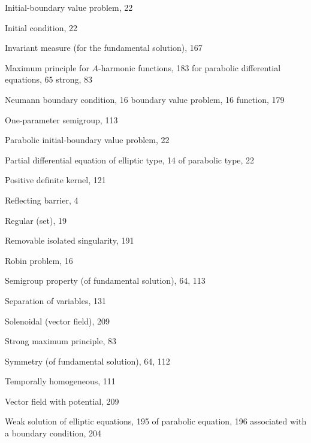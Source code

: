 \begin{theindex}
\indexspace

\item Initial-boundary value problem, 22
\item Initial condition, 22
\item Invariant measure (for the fundamental solution), 167

\indexspace

\item Maximum principle
\subitem for $A$-harmonic functions, 183
\subitem for parabolic differential equations, 65
\subitem strong, 83

\indexspace

\item Neumann
\subitem boundary condition, 16
\subitem boundary value problem, 16
\subitem function, 179

\indexspace

\item One-parameter semigroup, 113

\indexspace

\item Parabolic initial-boundary value problem, 22
\item Partial differential equation
\subitem of elliptic type, 14
\subitem of parabolic type, 22
\item Positive definite kernel, 121

\indexspace

\item Reflecting barrier, 4
\item Regular (set), 19
\item Removable isolated singularity, 191
\item Robin problem, 16

\indexspace

\item Semigroup property (of fundamental solution), 64, 113
\item Separation of variables, 131
\item Solenoidal (vector field), 209
\item Strong maximum principle, 83
\item Symmetry (of fundamental solution), 64, 112

\indexspace

\item Temporally homogeneous, 111

\indexspace

\item Vector field with potential, 209

\indexspace

\item Weak solution
\subitem of elliptic equations, 195
\subitem of parabolic equation, 196
\subitem associated with a boundary condition, 204

\end{theindex}

